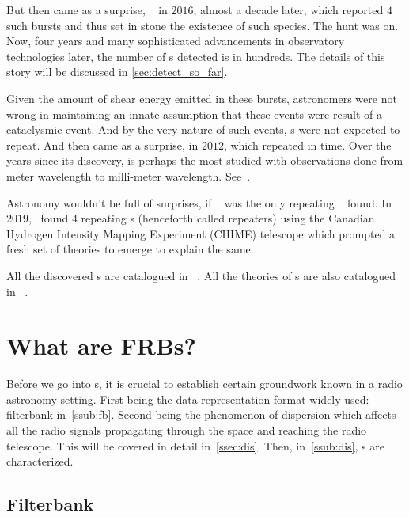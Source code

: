 \par But then came as a surprise, ~\cite{danburst4} in $2016$, almost a decade later, which reported $4$ such bursts and thus set in stone the existence of such species. The hunt was on.
Now, four years and many sophisticated advancements in observatory technologies later, the number of \frb{}s detected is in hundreds. The details of this story will be discussed in \autoref{sec:detect_so_far}.

\par Given the amount of shear energy emitted in these bursts, astronomers were not wrong in maintaining an innate assumption that these events were result of a cataclysmic event. And by the very nature of such events, \frb{}s were not expected to repeat. And then came as a surprise,  in $2012$, which repeated in time.
Over the years since its discovery,  is perhaps the most studied \frb{} with observations done from meter wavelength to milli-meter wavelength. See~\cite{spitler, palfa_frb}.

\par Astronomy wouldn't be full of surprises, if ~ was the only repeating \frb{}~ found. In $2019$,~\cite{chime_repeater8,chime_repeater9} found $4$ repeating \frb{}s (henceforth called repeaters) using the Canadian Hydrogen Intensity Mapping Experiment (CHIME) telescope which prompted a fresh set of theories to emerge to explain the same.

\par All the discovered \frb{}s are catalogued in ~\cite{frbcat}. All the theories of \frb{}s are also catalogued in ~\cite{frbtheorycat}.


\section{What are FRBs?}

\par Before we go into \frb{}s, it is crucial to establish certain groundwork known in a radio astronomy setting. 
First being the data representation format widely used: filterbank in~\autoref{ssub:fb}. 
Second being the phenomenon of dispersion which affects all the radio signals propagating through the space and reaching the radio telescope. 
This will be covered in detail in~\autoref{ssec:dis}. 
Then, in~\autoref{ssub:dis}, \frb{}s are characterized.

\subsection{Filterbank}
\label{ssub:fb}

